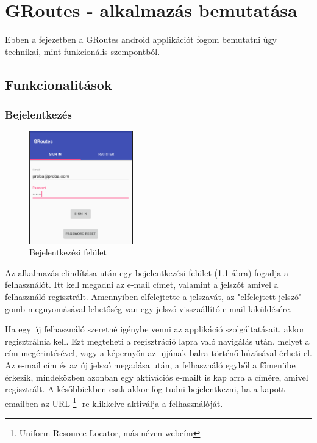 \chapter{GRoutes - alkalmazás bemutatása}\label{ch:ALAP}

\begin{osszefoglal}
	Ebben a fejezetben a GRoutes android applikációt fogom bemutatni úgy technikai, mint funkcionális szempontból.
	
\end{osszefoglal}

\section{Funkcionalitások}\label{sec:ALAP:adatelem}

\subsection{Bejelentkezés}

\begin{figure}
	\centering
	\setlength{\abovecaptionskip}{0pt}
	\setlength{\belowcaptionskip}{0pt}
	\includegraphics[width=0.4\textwidth]{images/login}
	\caption{Bejelentkezési felület\label{fig:login}}
\end{figure}

Az alkalmazás elindítása után egy bejelentkezési felület (\ref{fig:login} ábra) fogadja a felhasználót. Itt kell megadni az e-mail címet, valamint a jelszót amivel a felhasználó regisztrált. Amennyiben elfelejtette a jelszavát, az "elfelejtett jelszó" gomb megnyomásával lehetőség van egy jelszó-visszaállító e-mail kiküldésére. 

Ha egy új felhasználó szeretné igénybe venni az applikáció szolgáltatásait, akkor regisztrálnia kell. Ezt megteheti a regisztráció lapra való navigálás után, melyet a cím megérintésével, vagy a képernyőn az ujjának balra történő húzásával érheti el. Az e-mail cím és az új jelszó megadása után, a felhasználó egyből a főmenübe érkezik, mindeközben azonban egy aktivációs e-mailt is kap arra a címére, amivel regisztrált. A későbbiekben csak akkor fog tudni bejelentkezni, ha a kapott emailben az URL%
\footnote{ %
	Uniform Resource Locator, más néven webcím
}  %
-re klikkelve aktiválja a felhasználóját.

